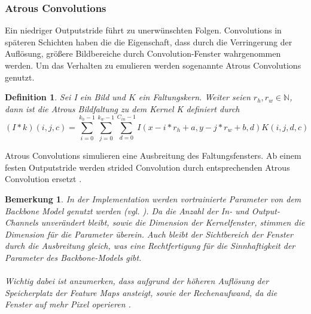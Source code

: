 \documentclass[12pt,DIV=15,BCOR=15mm,twoside,headsepline,abstract=true,listof=totoc,bibliography=totoc]{scrreprt}
\newtheorem{remark}{Bemerkung}[chapter]
\newtheorem{defi}{Definition}
\theoremstyle{remark}    %
\begin{document}
    \subsubsection{Atrous Convolutions}
    Ein niedriger Outputstride führt zu unerwünschten Folgen. Convolutions in späteren Schichten haben die die Eigenschaft, dass durch die Verringerung
    der Auflösung, größere Bildbereiche durch Convolution-Fenster wahrgenommen werden. Um das Verhalten zu emulieren werden sogenannte Atrous Convolutions genutzt. 
    \begin{defi}
    Sei I ein Bild und $K$ ein Faltungskern. Weiter seien $r_h, r_w \in \mathbb{N}$, dann ist die 
    Atrous Bildfaltung zu dem Kernel K definiert durch 
    \[
    (I * k)(i, j, c) = \sum_{i =0}^{k_h-1}\sum_{j=0}^{k_w-1} \sum_{d = 0}^{C_{in}-1}I(x-i*r_h +a, y-j*r_w+b, d)K(i,j,d,c)
    \]
    \end{defi}\noindent
    Atrous Convolutions simulieren eine Ausbreitung des Faltungsfensters. Ab einem festen Outputstride werden strided Convolution durch 
    entsprechenden Atrous Convolution ersetzt \cite{chen2017rethinkingatrousconvolutionsemantic}.
    \begin{remark}
    \label{bem:backboneparam}
        In der Implementation werden vortrainierte Parameter von dem Backbone Model genutzt werden (vgl. \cite{chen2017rethinkingatrousconvolutionsemantic,HaitzHuebnerUlrich2022}). 
        Da die Anzahl der In- und Output-Channels unverändert bleibt, 
        sowie die Dimension der Kernelfenster, stimmen die Dimension für die Parameter überein. Auch bleibt der Sichtbereich der Fenster durch die 
        Ausbreitung gleich, was eine Rechtfertigung für die Sinnhaftigkeit der Parameter des Backbone-Models gibt.\\\\
        Wichtig dabei ist anzumerken, dass aufgrund der höheren Auflösung der Speicherplatz der Feature Maps ansteigt, sowie der Rechenaufwand, da die Fenster auf 
        mehr Pixel operieren . \cite{Deeplabv3plus_PyTorch}
    \end{remark}
\end{document}
